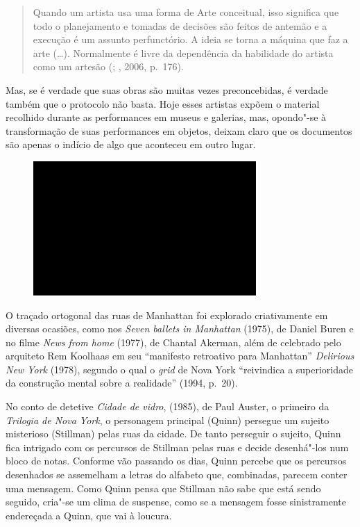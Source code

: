 \begin{quote}
Quando um artista usa uma forma de Arte conceitual, isso significa que
todo o planejamento e tomadas de decisões são feitos de antemão e a
execução é um assunto perfunctório. A ideia se torna a máquina que faz a
arte (\ldots{}). Normalmente é livre da dependência da habilidade do artista
como um artesão (; , 2006, p.~176).
\end{quote}

Mas, se é verdade que suas obras são muitas vezes preconcebidas, é
verdade também que o protocolo não basta. Hoje esses artistas expõem o
material recolhido durante as performances em museus e galerias, mas,
opondo"-se à transformação de suas performances em objetos, deixam claro
que os documentos são apenas o indício de algo que aconteceu em outro
lugar.

\begin{figure}[!ht]
\centering
 \includegraphics[width=85mm]{./imgs/im1.jpg}
\caption{\tiny{}}
\end{figure}

O traçado ortogonal das ruas de Manhattan foi explorado criativamente em
diversas ocasiões, como nos \emph{Seven ballets in Manhattan} (1975), de
Daniel Buren e no filme \emph{News from home} (1977), de Chantal
Akerman, além de celebrado pelo arquiteto Rem Koolhaas em seu
``manifesto retroativo para Manhattan'' \emph{Delirious New York}
(1978), segundo o qual o \emph{grid} de Nova York ``reivindica a
superioridade da construção mental sobre a realidade'' (1994, p.~20).

No conto de detetive \emph{Cidade de vidro}, (1985), de Paul Auster, o
primeiro da \emph{Trilogia de Nova York}, o personagem principal (Quinn)
persegue um sujeito misterioso (Stillman) pelas ruas da cidade. De tanto
perseguir o sujeito, Quinn fica intrigado com os percursos de Stillman
pelas ruas e decide desenhá"-los num bloco de notas. Conforme vão
passando os dias, Quinn percebe que os percursos desenhados se
assemelham a letras do alfabeto que, combinadas, parecem conter uma
mensagem. Como Quinn pensa que Stillman não sabe que está sendo seguido,
cria"-se um clima de suspense, como se a mensagem fosse sinistramente
endereçada a Quinn, que vai à loucura.


